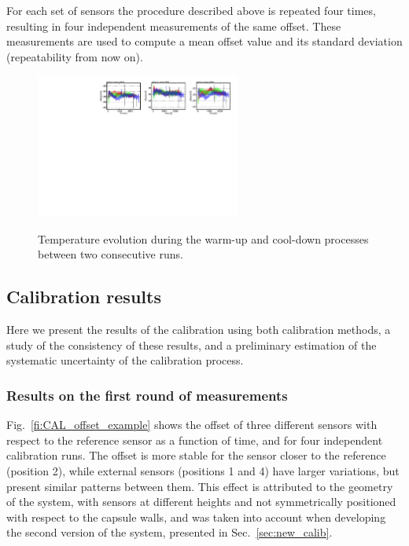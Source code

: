 For each set of sensors the procedure described above is repeated four times, resulting in four independent measurements of the same offset. These measurements are used to compute a mean offset value and its standard deviation (repeatability from now on).  

\begin{figure}[htbp]
\centering
{\includegraphics[width=0.6\textwidth]{images/figure_9.pdf}}
\caption{Temperature evolution during the warm-up and cool-down processes between two consecutive runs. }
\label{fi:CAL_pre}
\end{figure}


\subsection{Calibration results}
\label{sec:calib_results}
\noindent Here we present the results of the calibration using both calibration methods, a study of the consistency of these results, and a preliminary estimation of the systematic uncertainty of the calibration process.

\subsubsection{Results on the first round of measurements}
\noindent Fig.~\ref{fi:CAL_offset_example} shows the offset of three different sensors with respect to the reference sensor as a function of time, and for four independent calibration runs. The offset is more stable for the sensor closer to the reference (position 2), while external sensors (positions 1 and 4) have larger variations, but present similar patterns between them. This effect is attributed to the geometry of the system, with sensors at different heights and not symmetrically positioned with respect to the capsule walls, and was taken into account when developing the second version of the system, presented in Sec.~\ref{sec:new_calib}. 

